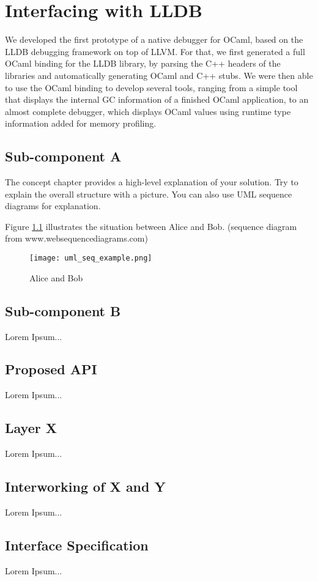\chapter{Interfacing with LLDB}

We developed the first prototype of a native debugger for OCaml, based on the LLDB debugging framework on top of LLVM. For that, we first generated a full OCaml binding for the LLDB library, by parsing the C++ headers of the libraries and automatically generating OCaml and C++ stubs. We were then able to use the OCaml binding to develop several tools, ranging from a simple tool that displays the internal GC information of a finished OCaml application, to an almost complete debugger, which displays OCaml values using runtime type information added for memory profiling.

\section{Sub-component A\label{sec:conceptsuba}}
The concept chapter provides a high-level explanation of your solution. Try to explain the overall structure with a picture. You can also use UML sequence diagrams for explanation.

Figure \ref{fig:aliceandbob} illustrates the situation between Alice and Bob. (sequence diagram from www.websequencediagrams.com)

\begin{figure}[htb]
  \centering
  \texttt{[image: uml\_seq\_example.png]}\\
  \caption{Alice and Bob}
  \label{fig:aliceandbob}
\end{figure}

\section{Sub-component B\label{sec:conceptsubb}}

Lorem Ipsum...

\section{Proposed API\label{sec:conceptsubb}}

Lorem Ipsum...

\section{Layer X\label{sec:conceptlayerx}}

Lorem Ipsum...

\section{Interworking of X and Y\label{sec:conceptinter}}

Lorem Ipsum...

\section{Interface Specification\label{sec:intspec}}

Lorem Ipsum...

